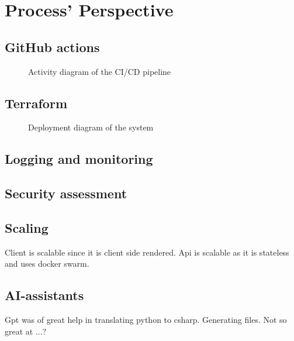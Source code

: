 \section{Process' Perspective}
\label{ch:background} 

\subsection{GitHub actions}
\begin{figure}
      \centering
      
      \caption{Activity diagram of the CI/CD pipeline}
      \label{fig:activity_diagram}
\end{figure}

\subsection{Terraform}
\begin{figure}[H]
      \centering
      
      \caption{Deployment diagram of the system}
      \label{fig:deployment_diagram}
\end{figure}

\subsection{Logging and monitoring}

\subsection{Security assessment}

\subsection{Scaling}

Client is scalable since it is client side rendered.
Api is scalable as it is stateless and uses docker swarm.

\subsection{AI-assistants}

Gpt was of great help in translating python to csharp.
Generating files.
Not so great at ...?